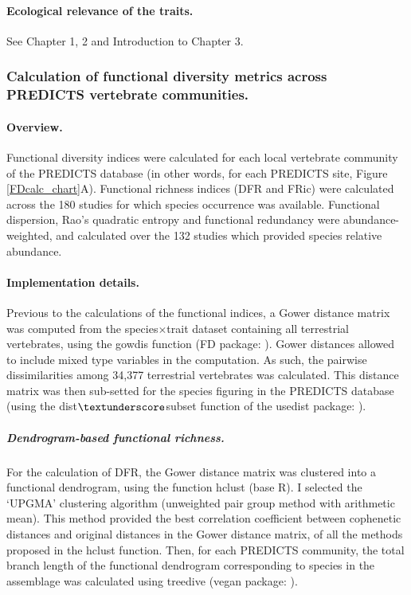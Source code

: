 \paragraph{Ecological relevance of the traits.} See Chapter 1, 2 and Introduction to Chapter 3.
 

\subsubsection{Calculation of functional diversity metrics across PREDICTS vertebrate communities.}

\paragraph{Overview.}
Functional diversity indices were calculated for each local vertebrate community of the PREDICTS database (in other words, for each PREDICTS site, Figure  \ref{FDcalc_chart}A). Functional richness indices (DFR and FRic) were calculated across the 180 studies for which species occurrence was available. Functional dispersion, Rao's quadratic entropy and functional redundancy were abundance-weighted, and calculated over the 132 studies which provided species relative abundance.
 
\paragraph{Implementation details.}
Previous to the calculations of the functional indices, a Gower distance matrix was computed from the species$\times$trait dataset containing all terrestrial vertebrates, using the gowdis function (FD package: \citet{Laliberte2010, Laliberte2015}). Gower distances allowed to include mixed type variables in the computation. As such, the pairwise dissimilarities among 34,377 terrestrial vertebrates was calculated. This distance matrix was then sub-setted for the species figuring in the PREDICTS database (using the dist$\textunderscore$subset function of the usedist package: \citet{usedist}).

\subparagraph{Dendrogram-based functional richness.} For the calculation of DFR, the Gower distance matrix was clustered into a functional dendrogram, using the function hclust (base R). I selected the `UPGMA' clustering algorithm (unweighted pair group method with arithmetic mean). This method provided the best correlation coefficient between cophenetic distances and original distances in the Gower distance matrix, of all the methods proposed in the hclust function. Then, for each PREDICTS community, the total branch length of the functional dendrogram corresponding to species in the assemblage was calculated using treedive (vegan package: \citet{vegan}). 

